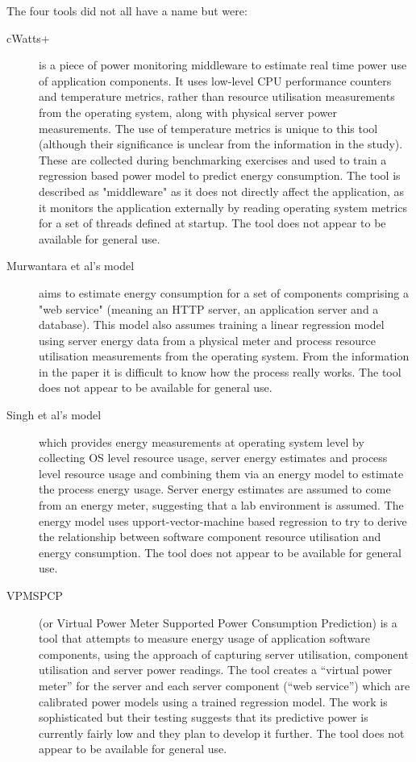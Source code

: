 The four tools did not all have a name but were:
\begin{description}
	\item[cWatts+] is a piece of power monitoring middleware to estimate real time power use of application components.  It uses low-level CPU performance counters and temperature metrics, rather than resource utilisation measurements from the operating system, along with physical server power measurements.  The use of temperature metrics is unique to this tool (although their significance is unclear from the information in the study).  These are collected during benchmarking exercises and used to train a regression based power model to predict energy consumption.  The tool is described as "middleware" as it does not directly affect the application, as it monitors the application externally by reading operating system metrics for a set of threads defined at startup. The tool does not appear to be available for general use. \cite{phung2017-agnosticpower}
	\item[Murwantara et al's model] aims to estimate energy consumption for a set of components comprising a "web service" (meaning an HTTP server, an application server and a database).  This model also assumes training a linear regression model using server energy data from a physical meter and process resource utilisation measurements from the operating system.  From the information in the paper it is difficult to know how the process really works. The tool does not appear to be available for general use. \cite{murwantara2014-webserviceenergy}
	\item [Singh et al's model] which provides energy measurements at operating system level by collecting OS level resource usage, server energy estimates and process level resource usage and combining them via an energy model to estimate the process energy usage.  Server energy estimates are assumed to come from an energy meter, suggesting that a lab environment is assumed. The energy model uses upport-vector-machine based regression to try to derive the relationship between software component resource utilisation and energy consumption.  The tool does not appear to be available for general use. \cite{singh2013-processenergyest}
	\item[VPMSPCP] (or Virtual Power Meter Supported Power Consumption Prediction) is a tool that attempts to measure energy usage of application software components, using the approach of capturing server utilisation, component utilisation and server power readings.  The tool creates a “virtual power meter” for the server and each server component (“web service”) which are calibrated power models using a trained regression model.  The work is sophisticated but their testing suggests that its predictive power is currently fairly low and they plan to develop it further. The tool does not appear to be available for general use. \cite{liu2015-webservicepower}
\end{description}

